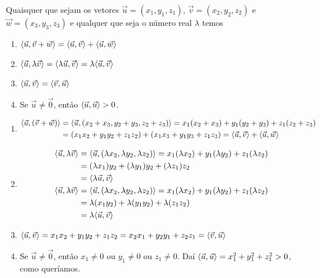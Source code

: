 \begin{proposicao}\label{propriedades-produto-vetorial-espaco}
    Quaisquer que sejam os vetores $\vec{u} = (x_1, y_1,z_1)$, $\vec{v} = (x_2, y_2,z_2)$ e $\vec{w} = (x_3, y_3,z_3)$ e qualquer que seja o número real $\lambda$ temos
    \begin{enumerate}[label=({\roman*})]
        \item\label{linearidade-soma-produto-vetorial-espaco} $\langle\vec{u}, \vec{v} + \vec{w}\rangle = \langle \vec{u}, \vec{v} \rangle + \langle \vec{u}, \vec{w} \rangle$
        \item\label{linearidade-escalar-produto-vetorial-espaco} $\langle\vec{u}, \lambda\vec{v}\rangle = \langle\lambda\vec{u}, \vec{v}\rangle = \lambda\langle \vec{u}, \vec{v} \rangle$
        \item $\langle \vec{u}, \vec{v} \rangle = \langle \vec{v}, \vec{u} \rangle$
        \item Se $\vec{u} \ne \vec{0}$, então $\langle \vec{u}, \vec{u} \rangle > 0$.
    \end{enumerate}
\end{proposicao}
\begin{prova}
    \begin{enumerate}[label=({\roman*})]
        \item \begin{align*}
                  \langle\vec{u}, (\vec{v} + \vec{w})\rangle & = \langle\vec{u}, (x_2 + x_3, y_2 + y_3, z_2 + z_3)\rangle = x_1(x_2 + x_3) + y_1(y_2 + y_3) + z_1(z_2+z_3) \\ &= (x_1x_2 + y_1y_2 + z_1z_2) + (x_1x_3 + y_1y_3 + z_1z_3) = \langle \vec{u}, \vec{v} \rangle + \langle \vec{u}, \vec{w} \rangle
              \end{align*}
        \item \begin{align*}
                  \langle\vec{u}, \lambda\vec{v}\rangle & = \langle\vec{u}, (\lambda x_2, \lambda y_2, \lambda z_2)\rangle = x_1(\lambda x_2) + y_1(\lambda y_2) + z_1(\lambda z_2) \\ &= (\lambda x_1)y_2 + (\lambda y_1)y_2 + (\lambda z_1)z_2 \\ &= \langle\lambda\vec{u}, \vec{v}\rangle\\
                  \langle\vec{u}, \lambda\vec{v}\rangle & = \langle\vec{u}, (\lambda x_2, \lambda y_2, \lambda z_2)\rangle = x_1(\lambda x_2) + y_1(\lambda y_2) + z_1(\lambda z_2) \\ &= \lambda (x_1y_2) + \lambda (y_1y_2) + \lambda(z_1z_2) \\ &= \lambda\langle \vec{u}, \vec{v} \rangle
              \end{align*}
        \item $\langle \vec{u}, \vec{v} \rangle = x_1x_2 + y_1y_2 + z_1z_2 = x_2x_1 + y_2y_1 + z_2z_1 = \langle \vec{v}, \vec{u} \rangle$
        \item Se $\vec{u} \ne \vec{0}$, então $x_1 \ne 0$ ou $y_1 \ne 0$ ou $z_1 \ne 0$. Daí $\langle \vec{u}, \vec{u} \rangle = x_1^2 + y_1^2 + z_1^2> 0$, como queríamos.
    \end{enumerate}
\end{prova}

